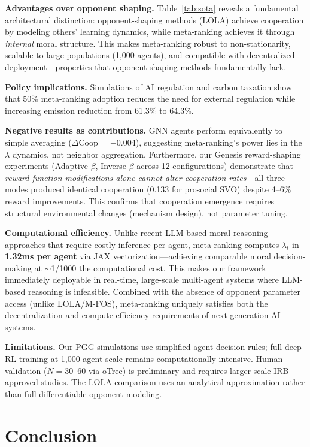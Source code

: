 \documentclass{article}
\begin{document}
\textbf{Advantages over opponent shaping.} Table~\ref{tab:sota} reveals a fundamental architectural distinction: opponent-shaping methods (LOLA) achieve cooperation by modeling others' learning dynamics, while meta-ranking achieves it through \textit{internal} moral structure. This makes meta-ranking robust to non-stationarity, scalable to large populations (1,000 agents), and compatible with decentralized deployment---properties that opponent-shaping methods fundamentally lack.

\textbf{Policy implications.} Simulations of AI regulation and carbon taxation show that 50\% meta-ranking adoption reduces the need for external regulation while increasing emission reduction from 61.3\% to 64.3\%.

\textbf{Negative results as contributions.} GNN agents perform equivalently to simple averaging ($\Delta$Coop = $-$0.004), suggesting meta-ranking's power lies in the $\lambda$ dynamics, not neighbor aggregation. Furthermore, our Genesis reward-shaping experiments (Adaptive $\beta$, Inverse $\beta$ across 12 configurations) demonstrate that \textit{reward function modifications alone cannot alter cooperation rates}---all three modes produced identical cooperation (0.133 for prosocial SVO) despite 4--6\% reward improvements. This confirms that cooperation emergence requires structural environmental changes (mechanism design), not parameter tuning.

\textbf{Computational efficiency.} Unlike recent LLM-based moral reasoning approaches that require costly inference per agent, meta-ranking computes $\lambda_t$ in \textbf{1.32ms per agent} via JAX vectorization---achieving comparable moral decision-making at $\sim$1/1000 the computational cost. This makes our framework immediately deployable in real-time, large-scale multi-agent systems where LLM-based reasoning is infeasible. Combined with the absence of opponent parameter access (unlike LOLA/M-FOS), meta-ranking uniquely satisfies both the decentralization and compute-efficiency requirements of next-generation AI systems.

\textbf{Limitations.} Our PGG simulations use simplified agent decision rules; full deep RL training at 1,000-agent scale remains computationally intensive. Human validation ($N{=}30$--60 via oTree) is preliminary and requires larger-scale IRB-approved studies. The LOLA comparison uses an analytical approximation rather than full differentiable opponent modeling.

\section{Conclusion}
\end{document}
